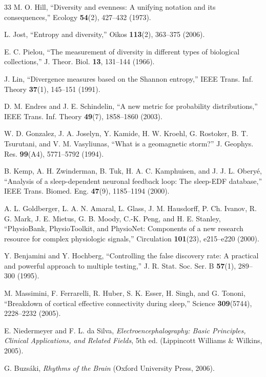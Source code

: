 \documentclass[aip,cha,reprint,amsmath,amssymb,final]{revtex4-2}
\begin{document}
\begin{thebibliography}{33}
 M. O. Hill, ``Diversity and evenness: A unifying notation and its consequences,'' Ecology \textbf{54}(2), 427--432 (1973).

 L. Jost, ``Entropy and diversity,'' Oikos \textbf{113}(2), 363--375 (2006).

 E. C. Pielou, ``The measurement of diversity in different types of biological collections,'' J. Theor. Biol. \textbf{13}, 131--144 (1966).

 J. Lin, ``Divergence measures based on the Shannon entropy,'' IEEE Trans. Inf. Theory \textbf{37}(1), 145--151 (1991).

 D. M. Endres and J. E. Schindelin, ``A new metric for probability distributions,'' IEEE Trans. Inf. Theory \textbf{49}(7), 1858--1860 (2003).

 W. D. Gonzalez, J. A. Joselyn, Y. Kamide, H. W. Kroehl, G. Rostoker, B. T. Tsurutani, and V. M. Vasyliunas, ``What is a geomagnetic storm?'' J. Geophys. Res. \textbf{99}(A4), 5771--5792 (1994).

 B. Kemp, A. H. Zwinderman, B. Tuk, H. A. C. Kamphuisen, and J. J. L. Obery{\'e}, ``Analysis of a sleep-dependent neuronal feedback loop: The sleep-EDF database,'' IEEE Trans. Biomed. Eng. \textbf{47}(9), 1185--1194 (2000).

 A. L. Goldberger, L. A. N. Amaral, L. Glass, J. M. Hausdorff, P. Ch. Ivanov, R. G. Mark, J. E. Mietus, G. B. Moody, C.-K. Peng, and H. E. Stanley, ``PhysioBank, PhysioToolkit, and PhysioNet: Components of a new research resource for complex physiologic signals,'' Circulation \textbf{101}(23), e215--e220 (2000).

 Y. Benjamini and Y. Hochberg, ``Controlling the false discovery rate: A practical and powerful approach to multiple testing,'' J. R. Stat. Soc. Ser. B \textbf{57}(1), 289--300 (1995).

 M. Massimini, F. Ferrarelli, R. Huber, S. K. Esser, H. Singh, and G. Tononi, ``Breakdown of cortical effective connectivity during sleep,'' Science \textbf{309}(5744), 2228--2232 (2005).

 E. Niedermeyer and F. L. da Silva, \emph{Electroencephalography: Basic Principles, Clinical Applications, and Related Fields}, 5th ed. (Lippincott Williams \& Wilkins, 2005).

 G. Buzs{\'a}ki, \emph{Rhythms of the Brain} (Oxford University Press, 2006).


\end{thebibliography}
\end{document}
